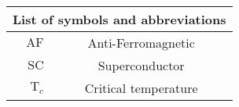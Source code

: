	\thispagestyle{plain}
	\begin{table}
		\centering
		\begin{tabular}{r c}
			\multicolumn{2}{c}{\textbf{List of symbols and abbreviations}} \\
			\midrule
			$\mathrm{AF}$ & Anti-Ferromagnetic \\
			$\mathrm{SC}$ & Superconductor \\
			$\mathrm{T}_c$ & Critical temperature \\
		\end{tabular}
	\end{table}
\restoregeometry 
